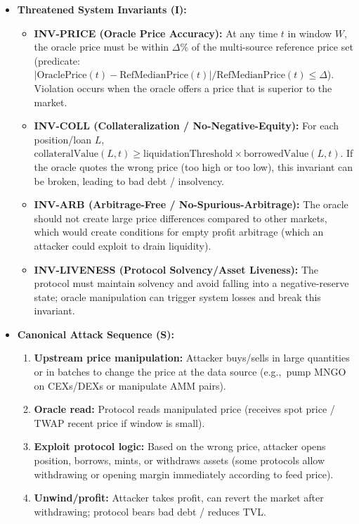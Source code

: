 \begin{itemize}
    \item \textbf{Threatened System Invariants (I):}
        \begin{itemize}
            \item \textbf{INV-PRICE (Oracle Price Accuracy):} At any time $t$ in window $W$, the oracle price must be within $\Delta\%$ of the multi-source reference price set (predicate: $|\text{OraclePrice}(t) - \text{RefMedianPrice}(t)|/\text{RefMedianPrice}(t) \leq \Delta$). Violation occurs when the oracle offers a price that is superior to the market. \cite{chainalysis2023oracle}
            \item \textbf{INV-COLL (Collateralization / No-Negative-Equity):} For each position/loan $L$, $\text{collateralValue}(L,t) \geq \text{liquidationThreshold} \times \text{borrowedValue}(L,t)$. If the oracle quotes the wrong price (too high or too low), this invariant can be broken, leading to bad debt / insolvency. \cite{kessler2022exploit}
            \item \textbf{INV-ARB (Arbitrage-Free / No-Spurious-Arbitrage):} The oracle should not create large price differences compared to other markets, which would create conditions for empty profit arbitrage (which an attacker could exploit to drain liquidity). \cite{solidus2022mango}
            \item \textbf{INV-LIVENESS (Protocol Solvency/Asset Liveness):} The protocol must maintain solvency and avoid falling into a negative-reserve state; oracle manipulation can trigger system losses and break this invariant. \cite{akartuna2022mango}
        \end{itemize}

    \item \textbf{Canonical Attack Sequence (S):}
        \begin{enumerate}
            \item \textbf{Upstream price manipulation:} Attacker buys/sells in large quantities or in batches to change the price at the data source (e.g.,\ pump MNGO on CEXs/DEXs or manipulate AMM pairs). \cite{solidus2022mango, kessler2022exploit}
            \item \textbf{Oracle read:} Protocol reads manipulated price (receives spot price / TWAP recent price if window is small).
            \item \textbf{Exploit protocol logic:} Based on the wrong price, attacker opens position, borrows, mints, or withdraws assets (some protocols allow withdrawing or opening margin immediately according to feed price).
            \item \textbf{Unwind/profit:} Attacker takes profit, can revert the market after withdrawing; protocol bears bad debt / reduces TVL. \cite{akartuna2022mango}
        \end{enumerate}
\end{itemize}

